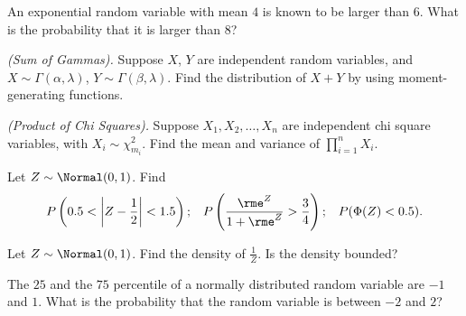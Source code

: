 \begin{problem}[Handout 13, \# 17]
  An exponential random variable with mean \(4\) is known to be larger than
  \(6\). What is the probability that it is larger than \(8\)?
\end{problem}
\begin{solution}

\end{solution}
\newpage

\begin{problem}[Handout 13, \# 18]
  \emph{(Sum of Gammas).} Suppose \(X\), \(Y\) are independent random
  variables, and \(X\sim \Gamma(\alpha,\lambda)\),
  \(Y\sim \Gamma(\beta,\lambda)\). Find the distribution of \(X+Y\) by
  using moment-generating functions.
\end{problem}
\begin{solution}
\end{solution}
\newpage

\begin{problem}[Handout 13, \# 19]
  \emph{(Product of Chi Squares).} Suppose \(X_1,X_2,\dotsc,X_n\) are
  independent chi square variables, with \(X_i\sim\chi_{m_i}^2\). Find the
  mean and variance of \(\prod_{i=1}^n X_i\).
\end{problem}
\begin{solution}

\end{solution}
\newpage

\begin{problem}[Handout 13, \# 20]
  Let \(Z\sim\Normal(0,1)\). Find
  \[
    \begin{aligned}
      P\left( 0.5<\left|Z-\frac{1}{2}\right|<1.5\right);
      && P\left(\frac{\rme^Z}{1+\rme^Z}>\frac{3}{4}\right);
      &&P(\Phi(Z)<0.5).
    \end{aligned}
  \]
\end{problem}
\begin{solution}

\end{solution}
\newpage

\begin{problem}[Handout 13, \# 21]
  Let \(Z\sim\Normal(0,1)\). Find the density of \(\frac{1}{Z}\). Is the
  density bounded?
\end{problem}
\begin{solution}

\end{solution}
\newpage

\begin{problem}[Handout 13, \# 22]
  The \(25\) and the \(75\) percentile of a
  normally distributed random variable are \(-1\) and \(1\). What is the
  probability that the random variable is between \(-2\) and \(2\)?
\end{problem}
\begin{solution}

\end{solution}


